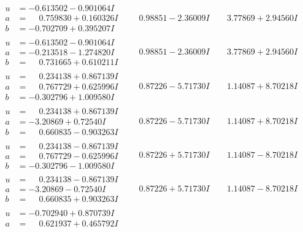 \documentclass[1p]{elsarticle_modified}
\theoremstyle{definition}
\begin{document}
$$\begin{array}{c|c|c}
\begin{aligned}
u &= -0.613502 - 0.901064 I \\
a &= \phantom{-}0.759830 + 0.160326 I \\
b &= -0.702709 + 0.395207 I\end{aligned}
 & \phantom{-}0.98851 - 2.36009 I & \phantom{-}3.77869 + 2.94560 I \\ \hline\begin{aligned}
u &= -0.613502 - 0.901064 I \\
a &= -0.213518 - 1.274820 I \\
b &= \phantom{-}0.731665 + 0.610211 I\end{aligned}
 & \phantom{-}0.98851 - 2.36009 I & \phantom{-}3.77869 + 2.94560 I \\ \hline\begin{aligned}
u &= \phantom{-}0.234138 + 0.867139 I \\
a &= \phantom{-}0.767729 + 0.625996 I \\
b &= -0.302796 + 1.009580 I\end{aligned}
 & \phantom{-}0.87226 - 5.71730 I & \phantom{-}1.14087 + 8.70218 I \\ \hline\begin{aligned}
u &= \phantom{-}0.234138 + 0.867139 I \\
a &= -3.20869 + 0.72540 I \\
b &= \phantom{-}0.660835 - 0.903263 I\end{aligned}
 & \phantom{-}0.87226 - 5.71730 I & \phantom{-}1.14087 + 8.70218 I \\ \hline\begin{aligned}
u &= \phantom{-}0.234138 - 0.867139 I \\
a &= \phantom{-}0.767729 - 0.625996 I \\
b &= -0.302796 - 1.009580 I\end{aligned}
 & \phantom{-}0.87226 + 5.71730 I & \phantom{-}1.14087 - 8.70218 I \\ \hline\begin{aligned}
u &= \phantom{-}0.234138 - 0.867139 I \\
a &= -3.20869 - 0.72540 I \\
b &= \phantom{-}0.660835 + 0.903263 I\end{aligned}
 & \phantom{-}0.87226 + 5.71730 I & \phantom{-}1.14087 - 8.70218 I \\ \hline\begin{aligned}
u &= -0.702940 + 0.870739 I \\
a &= \phantom{-}0.621937 + 0.465792 I \\

\end{aligned}
\end{array}$$
\end{document}
